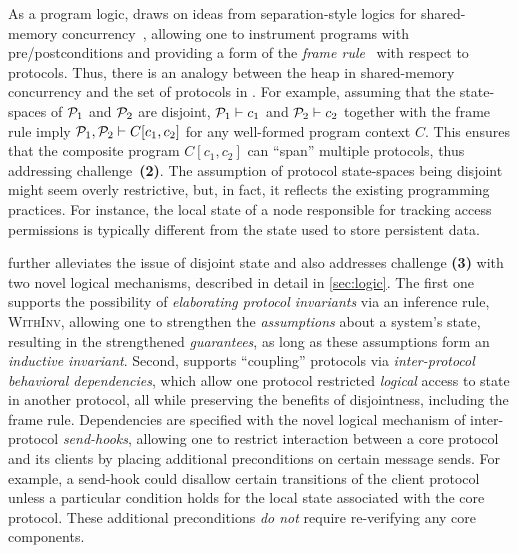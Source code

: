 As a program logic, \disel draws on ideas from separation-style logics
for shared-memory
concurrency~\cite{Nanevski-al:ESOP14,Turon-al:OOPSLA14}, allowing one
to instrument programs with pre/postconditions and providing a form of
the \emph{frame rule}~\cite{Reynolds:LICS02} with respect to
protocols. Thus, there is an analogy between the heap in shared-memory concurrency
and the set of protocols in \disel.
For example, assuming that the state-spaces of $\mathcal{P}_1$ and
$\mathcal{P}_2$ are disjoint, $\mathcal{P}_1 \vdash c_1$ and $\mathcal{P}_2 \vdash c_2$
together with the frame rule imply $\mathcal{P}_1, \mathcal{P}_2 \vdash C[c_1, c_2]$
for any well-formed program context $C$.
%
This ensures that
the composite program $C[c_1, c_2]$ can ``span''
multiple protocols, thus addressing challenge~\textbf{(2)}.
%
The assumption of protocol state-spaces being disjoint might seem overly
restrictive, but, in fact, it reflects the existing programming
practices.
%
For instance, the local state of a node responsible for
tracking access permissions is typically different from the state
used to store persistent data.

\disel further alleviates the issue of disjoint state and also
addresses challenge \textbf{(3)} with two novel logical mechanisms,
described in detail in \cref{sec:logic}.
%
The first one supports the possibility of \emph{elaborating protocol
  invariants} via an inference rule, \textsc{WithInv}, allowing one to
strengthen the \emph{assumptions} about a system's state, resulting in
the strengthened \emph{guarantees}, as long as these assumptions form
an \emph{inductive invariant}.
%
Second, \disel supports ``coupling'' protocols via
\emph{inter-protocol behavioral dependencies}, which allow one
protocol restricted \emph{logical} access to state in another
protocol, all while preserving the benefits of disjointness, including
the frame rule.
%
Dependencies are specified with the novel logical mechanism of
inter-protocol \emph{send-hooks}, allowing one to restrict interaction
between a core protocol and its clients by placing additional
preconditions on certain message sends.
%
For example, a send-hook could disallow certain transitions of the
client protocol unless a particular condition holds for the local
state associated with the core protocol.
%
These additional preconditions \emph{do not} require re-verifying any
core components.


